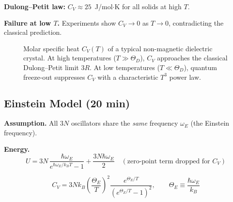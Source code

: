 \documentclass[11pt,a4paper]{article}
\begin{document}
\textbf{Dulong--Petit law:} $C_V\approx 25$~J/mol$\cdot$K for all solids at high $T$.

\textbf{Failure at low $T$.} Experiments show $C_V\to0$ as $T\to0$, contradicting the
classical prediction.

\begin{figure}[htbp]
\centering
{}
\caption{Molar specific heat $C_V(T)$ of a typical non-magnetic dielectric crystal. At high temperatures ($T \gg \Theta_D$), $C_V$ approaches the classical Dulong--Petit limit $3R$. At low temperatures ($T \ll \Theta_D$), quantum freeze-out suppresses $C_V$ with a characteristic $T^3$ power law.}
\label{fig:cv_experimental_vs_classical}
\end{figure}

\subsection{Einstein Model \hfill \small(20 min)}

\textbf{Assumption.} All $3N$ oscillators share the \emph{same} frequency $\omega_E$
(the Einstein frequency).

\textbf{Energy.}
\[
U = 3N\,\frac{\hbar\omega_E}{e^{\hbar\omega_E/k_BT}-1} + \frac{3N\hbar\omega_E}{2}
\quad(\text{zero-point term dropped for } C_V)
\]

\begin{keybox}
\[
C_V = 3Nk_B\left(\frac{\Theta_E}{T}\right)^2\frac{e^{\Theta_E/T}}{\left(e^{\Theta_E/T}-1\right)^2},
\qquad \Theta_E \equiv \frac{\hbar\omega_E}{k_B}
\]
\end{keybox}
\end{document}
